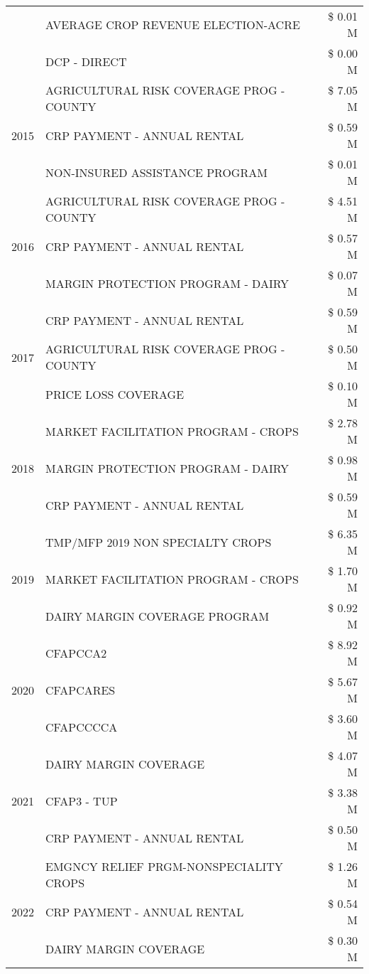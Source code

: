 \begin{tabular}{llr}
 & AVERAGE CROP REVENUE ELECTION-ACRE & \$ 0.01 M \\
 & DCP - DIRECT & \$ 0.00 M \\
\cline{1-3}
\multirow[t]{3}{*}{2015} & AGRICULTURAL RISK COVERAGE PROG - COUNTY & \$ 7.05 M \\
 & CRP PAYMENT - ANNUAL RENTAL & \$ 0.59 M \\
 & NON-INSURED ASSISTANCE PROGRAM & \$ 0.01 M \\
\cline{1-3}
\multirow[t]{3}{*}{2016} & AGRICULTURAL RISK COVERAGE PROG - COUNTY & \$ 4.51 M \\
 & CRP PAYMENT - ANNUAL RENTAL & \$ 0.57 M \\
 & MARGIN PROTECTION PROGRAM - DAIRY & \$ 0.07 M \\
\cline{1-3}
\multirow[t]{3}{*}{2017} & CRP PAYMENT - ANNUAL RENTAL & \$ 0.59 M \\
 & AGRICULTURAL RISK COVERAGE PROG - COUNTY & \$ 0.50 M \\
 & PRICE LOSS COVERAGE & \$ 0.10 M \\
\cline{1-3}
\multirow[t]{3}{*}{2018} & MARKET FACILITATION PROGRAM - CROPS & \$ 2.78 M \\
 & MARGIN PROTECTION PROGRAM - DAIRY & \$ 0.98 M \\
 & CRP PAYMENT - ANNUAL RENTAL & \$ 0.59 M \\
\cline{1-3}
\multirow[t]{3}{*}{2019} & TMP/MFP 2019 NON SPECIALTY CROPS & \$ 6.35 M \\
 & MARKET FACILITATION PROGRAM - CROPS & \$ 1.70 M \\
 & DAIRY MARGIN COVERAGE PROGRAM & \$ 0.92 M \\
\cline{1-3}
\multirow[t]{3}{*}{2020} & CFAPCCA2 & \$ 8.92 M \\
 & CFAPCARES & \$ 5.67 M \\
 & CFAPCCCCA & \$ 3.60 M \\
\cline{1-3}
\multirow[t]{3}{*}{2021} & DAIRY MARGIN COVERAGE & \$ 4.07 M \\
 & CFAP3 - TUP & \$ 3.38 M \\
 & CRP PAYMENT - ANNUAL RENTAL & \$ 0.50 M \\
\cline{1-3}
\multirow[t]{3}{*}{2022} & EMGNCY RELIEF PRGM-NONSPECIALITY CROPS & \$ 1.26 M \\
 & CRP PAYMENT - ANNUAL RENTAL & \$ 0.54 M \\
 & DAIRY MARGIN COVERAGE & \$ 0.30 M \\
\cline{1-3}
\bottomrule
\end{tabular}
